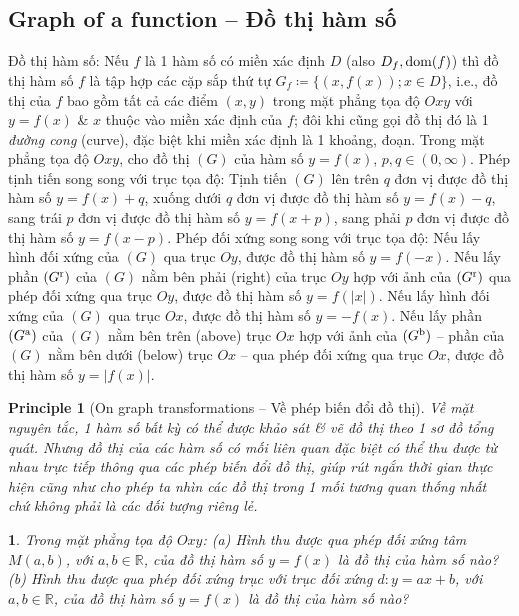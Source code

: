 \documentclass{article}
\newtheorem{baitoan}{}
\newtheorem{principle}{Principle}
\begin{document}
\subsection{Graph of a function -- Đồ thị hàm số}
 {\sf Đồ thị hàm số}: Nếu $f$ là 1 hàm số có miền xác định $D$ (also $D_f,{\rm dom}(f)$) thì đồ thị hàm số $f$ là tập hợp các cặp sắp thứ tự $G_f\coloneqq\{(x,f(x));x\in D\}$, i.e., đồ thị của $f$ bao gồm tất cả các điểm $(x,y)$ trong mặt phẳng tọa độ $Oxy$ với $y = f(x)$ \& $x$ thuộc vào miền xác định của $f$; đôi khi cũng gọi đồ thị đó là 1 {\it đường cong} (curve), đặc biệt khi miền xác định là 1 khoảng, đoạn.  Trong mặt phẳng tọa độ $Oxy$, cho đồ thị $(G)$ của hàm số $y = f(x)$, $p,q\in(0,\infty)$. {\sf Phép tịnh tiến song song với trục tọa độ}: Tịnh tiến $(G)$ lên trên $q$ đơn vị được đồ thị hàm số $y = f(x) + q$, xuống dưới $q$ đơn vị được đồ thị hàm số $y = f(x) - q$, sang trái $p$ đơn vị được đồ thị hàm số $y = f(x + p)$, sang phải $p$ đơn vị được đồ thị hàm số $y = f(x - p)$. {\sf Phép đối xứng song song với trục tọa độ}: Nếu lấy hình đối xứng của $(G)$ qua trục $Oy$, được đồ thị hàm số $y = f(-x)$. Nếu lấy phần $(G^{\rm r})$ của $(G)$ nằm bên phải (right) của trục $Oy$ hợp với ảnh của $(G^{\rm r})$ qua phép đối xứng qua trục $Oy$, được đồ thị hàm số $y = f(|x|)$. Nếu lấy hình đối xứng của $(G)$ qua trục $Ox$, được đồ thị hàm số $y = -f(x)$. Nếu lấy phần $(G^{\rm a})$ của $(G)$ nằm bên trên (above) trục $Ox$ hợp với ảnh của $(G^{\rm b})$ -- phần của $(G)$ nằm bên dưới (below) trục $Ox$ -- qua phép đối xứng qua trục $Ox$, được đồ thị hàm số $y = |f(x)|$.

\begin{principle}[On graph transformations -- Về phép biến đổi đồ thị]
	Về mặt nguyên tắc, 1 hàm số bất kỳ có thể được khảo sát \& vẽ đồ thị theo 1 sơ đồ tổng quát. Nhưng đồ thị của các hàm số có mối liên quan đặc biệt có thể thu được từ nhau trực tiếp thông qua các phép biến đổi đồ thị, giúp rút ngắn thời gian thực hiện cũng như cho phép ta nhìn các đồ thị trong 1 mối tương quan thống nhất chứ không phải là các đối tượng riêng lẻ.
\end{principle}

\begin{baitoan}
	Trong mặt phẳng tọa độ $Oxy$: (a) Hình thu được qua phép đối xứng tâm $M(a,b)$, với $a,b\in\mathbb{R}$, của đồ thị hàm số $y = f(x)$ là đồ thị của hàm số nào? (b) Hình thu được qua phép đối xứng trục với trục đối xứng $d:y = ax + b$, với $a,b\in\mathbb{R}$, của đồ thị hàm số $y = f(x)$ là đồ thị của hàm số nào?
\end{baitoan}
\end{document}
